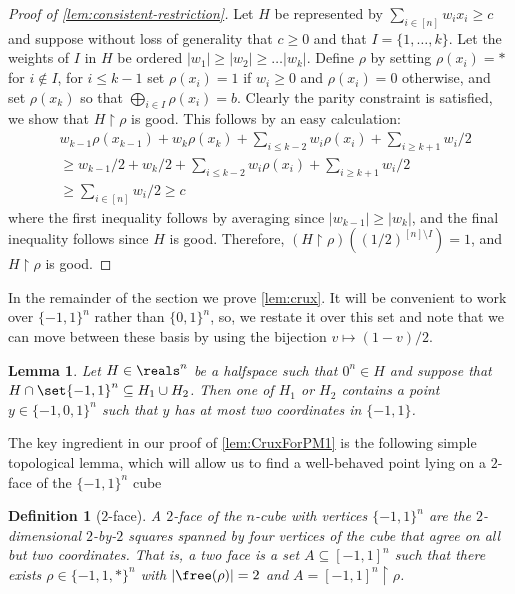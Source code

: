 \documentclass[11pt]{article}
\newtheorem{lemma}[theorem]{Lemma}
\newtheorem{definition}[theorem]{Definition}
\begin{document}
\begin{proof}[Proof of \autoref{lem:consistent-restriction}]
	Let $H$ be represented by $\sum_{i \in [n]} w_i x_i \geq c$ and suppose without loss of generality that $c \geq 0$ and that $I = \{1, \ldots, k\}$. 
	Let the weights of $I$ in $H$ be ordered $|w_1| \geq |w_2| \geq \ldots |w_k|$. 
	Define $\rho$ by setting $\rho(x_i) = *$ for $i \not \in I$, for $i \leq k-1$ set $\rho(x_i) = 1$ if $w_i \geq 0$ and $\rho(x_i) = 0$ otherwise, and set $\rho(x_k)$ so that $\bigoplus_{i \in I} \rho(x_i) = b$. 
	Clearly the parity constraint is satisfied, we show that $H \restriction \rho$ is good.
	This follows by an easy calculation:
	\begin{align*} 
		 &w_{k-1}\rho(x_{k-1}) + w_k\rho(x_k) + \sum_{i \leq k-2} w_i \rho(x_i) + \sum_{i \geq k+1} w_i/2 \\
			&\geq w_{k-1}/2 + w_k/2 + \sum_{i \leq k-2} w_i \rho(x_i) + \sum_{i \geq k+1} w_i/2 	\\
			&\geq \sum_{i \in [n]} w_i/2 \geq c 
	\end{align*}
	where the first inequality follows by averaging since $|w_{k-1}| \geq |w_{k}|$, and the final inequality follows since $H$ is good. Therefore, $(H \restriction \rho)((1/2)^{[n]\setminus I}) =1 $, and $H \restriction \rho$ is good.
\end{proof}


In the remainder of the section we prove \autoref{lem:crux}.
It will be convenient to work over $\{-1,1\}^n$ rather than $\{0,1\}^n$, so, we restate it over this set and note that we can move between these basis by using the bijection $v \mapsto (1-v)/2$.

\begin{lemma}\label{lem:CruxForPM1}
	Let $H \in \reals^n$ be a halfspace such that $0^n \in H$ and suppose that $H \cap \set{-1,1}^n \subseteq H_1 \cup H_2$. 
	Then one of $H_1$ or $H_2$ contains a point $y \in \{-1,0,1\}^n$ such that $y$ has at most two coordinates in $\{-1,1\}$. 
\end{lemma}

The key ingredient in our proof of \autoref{lem:CruxForPM1} is the following simple topological lemma, which will allow us to find a well-behaved point lying on a $2$-face of the $\{-1,1\}^n$ cube

\begin{definition}[$2$-face]
	A $2$-face of the $n$-cube with vertices $\{-1,1\}^n$ are the $2$-dimensional $2$-by-$2$ squares spanned by four vertices of the cube that agree on all but two coordinates. 
%
That is, a two face is a set $A \subseteq [-1,1]^n$ such that there exists $\rho \in \{-1,1,*\}^n$ with $|\free(\rho)| = 2$ and $A = [-1,1]^n \restriction \rho$.
\end{definition}
\end{document}
